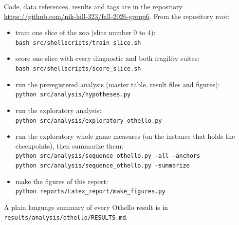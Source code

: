 \documentclass[11pt]{scrartcl}
\begin{document}
Code, data references, results and tags are in the repository
\url{https://github.com/nik-hill-323/fall-2026-group6}. From the repository root:
\begin{itemize}
    \item train one slice of the zoo (slice number 0 to 4):\\ \texttt{bash src/shellscripts/train\_slice.sh}
    \item score one slice with every diagnostic and both fragility suites:\\
    \texttt{bash src/shellscripts/score\_slice.sh}
    \item run the preregistered analysis (master table, result files and figures):\\
    \texttt{python src/analysis/hypotheses.py}
    \item run the exploratory analysis:\\ \texttt{python src/analysis/exploratory\_othello.py}
    \item run the exploratory whole game measures (on the instance that holds the checkpoints), then
    summarize them:\\ \texttt{python src/analysis/sequence\_othello.py --all --anchors}\\
    \texttt{python src/analysis/sequence\_othello.py --summarize}
    \item make the figures of this report:\\ \texttt{python reports/Latex\_report/make\_figures.py}
\end{itemize}
A plain language summary of every Othello result is in \texttt{results/analysis/othello/RESULTS.md}.
\end{document}
